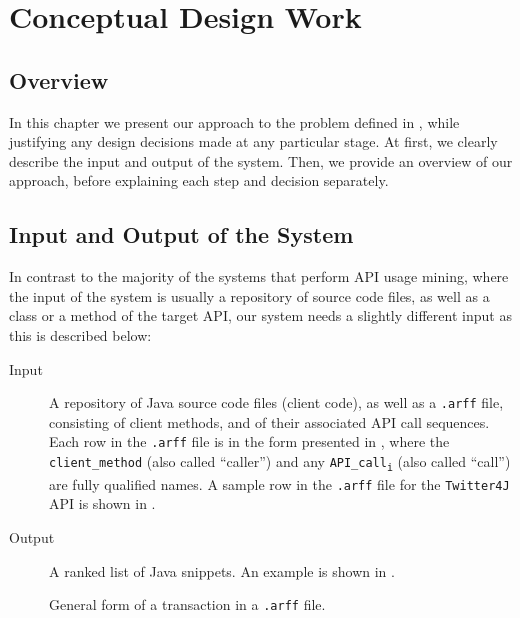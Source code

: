 \chapter{Conceptual Design Work}
\label{chap:conceptual-design-work}

\section{Overview}
\label{sec:conceptual-overview}

In this chapter we present our approach to the problem defined in , while justifying any design decisions made at any particular stage. At first, we clearly describe the input and output of the system. Then, we provide an overview of our approach, before explaining each step and decision separately.


\section{Input and Output of the System}
\label{sec:input-output}

In contrast to the majority of the systems that perform API usage mining, where the input of the system is usually a repository of source code files, as well as a class or a method of the target API, our system needs a slightly different input as this is described below:

\begin{description}
\item[Input] A repository of Java source code files (client code), as well as a \texttt{.arff} file, consisting of client methods, and of their associated API call sequences. Each row in the \texttt{.arff} file is in the form presented in , where the \texttt{client\_method} (also called ``caller'') and any \texttt{API\_call\textsubscript{i}} (also called ``call'') are fully qualified names. A sample row in the \texttt{.arff} file for the \texttt{Twitter4J} API is shown in .
\item[Output] A ranked list of Java snippets. An example is shown in .
\end{description}

\begin{figure}[h]
  
  \vspace{-10pt}
  \caption[Transaction in the \texttt{.arff} file]{General form of a transaction in a \texttt{.arff} file.}
\label{listings:arff-transaction}
\end{figure}


